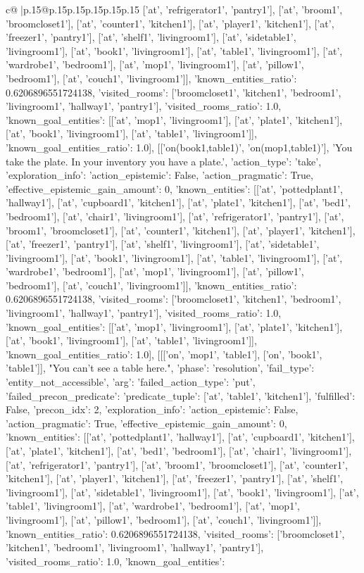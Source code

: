 \documentclass{article}
\begin{document}
{\begin{supertabular}{c@{$\;$}|p{.15\linewidth}@{}p{.15\linewidth}p{.15\linewidth}p{.15\linewidth}p{.15\linewidth}p{.15\linewidth}}
{{{['at', 'refrigerator1', 'pantry1'], ['at', 'broom1', 'broomcloset1'], ['at', 'counter1', 'kitchen1'], ['at', 'player1', 'kitchen1'], ['at', 'freezer1', 'pantry1'], ['at', 'shelf1', 'livingroom1'], ['at', 'sidetable1', 'livingroom1'], ['at', 'book1', 'livingroom1'], ['at', 'table1', 'livingroom1'], ['at', 'wardrobe1', 'bedroom1'], ['at', 'mop1', 'livingroom1'], ['at', 'pillow1', 'bedroom1'], ['at', 'couch1', 'livingroom1']], 'known_entities_ratio': 0.6206896551724138, 'visited_rooms': ['broomcloset1', 'kitchen1', 'bedroom1', 'livingroom1', 'hallway1', 'pantry1'], 'visited_rooms_ratio': 1.0, 'known_goal_entities': [['at', 'mop1', 'livingroom1'], ['at', 'plate1', 'kitchen1'], ['at', 'book1', 'livingroom1'], ['at', 'table1', 'livingroom1']], 'known_goal_entities_ratio': 1.0}}], [['on(book1,table1)', 'on(mop1,table1)'], 'You take the plate. In your inventory you have a plate.', {'action_type': 'take', 'exploration_info': {'action_epistemic': False, 'action_pragmatic': True, 'effective_epistemic_gain_amount': 0, 'known_entities': [['at', 'pottedplant1', 'hallway1'], ['at', 'cupboard1', 'kitchen1'], ['at', 'plate1', 'kitchen1'], ['at', 'bed1', 'bedroom1'], ['at', 'chair1', 'livingroom1'], ['at', 'refrigerator1', 'pantry1'], ['at', 'broom1', 'broomcloset1'], ['at', 'counter1', 'kitchen1'], ['at', 'player1', 'kitchen1'], ['at', 'freezer1', 'pantry1'], ['at', 'shelf1', 'livingroom1'], ['at', 'sidetable1', 'livingroom1'], ['at', 'book1', 'livingroom1'], ['at', 'table1', 'livingroom1'], ['at', 'wardrobe1', 'bedroom1'], ['at', 'mop1', 'livingroom1'], ['at', 'pillow1', 'bedroom1'], ['at', 'couch1', 'livingroom1']], 'known_entities_ratio': 0.6206896551724138, 'visited_rooms': ['broomcloset1', 'kitchen1', 'bedroom1', 'livingroom1', 'hallway1', 'pantry1'], 'visited_rooms_ratio': 1.0, 'known_goal_entities': [['at', 'mop1', 'livingroom1'], ['at', 'plate1', 'kitchen1'], ['at', 'book1', 'livingroom1'], ['at', 'table1', 'livingroom1']], 'known_goal_entities_ratio': 1.0}}], [[['on', 'mop1', 'table1'], ['on', 'book1', 'table1']], "You can't see a table here.", {'phase': 'resolution', 'fail_type': 'entity_not_accessible', 'arg': {'failed_action_type': 'put', 'failed_precon_predicate': {'predicate_tuple': ['at', 'table1', 'kitchen1'], 'fulfilled': False, 'precon_idx': 2}}, 'exploration_info': {'action_epistemic': False, 'action_pragmatic': True, 'effective_epistemic_gain_amount': 0, 'known_entities': [['at', 'pottedplant1', 'hallway1'], ['at', 'cupboard1', 'kitchen1'], ['at', 'plate1', 'kitchen1'], ['at', 'bed1', 'bedroom1'], ['at', 'chair1', 'livingroom1'], ['at', 'refrigerator1', 'pantry1'], ['at', 'broom1', 'broomcloset1'], ['at', 'counter1', 'kitchen1'], ['at', 'player1', 'kitchen1'], ['at', 'freezer1', 'pantry1'], ['at', 'shelf1', 'livingroom1'], ['at', 'sidetable1', 'livingroom1'], ['at', 'book1', 'livingroom1'], ['at', 'table1', 'livingroom1'], ['at', 'wardrobe1', 'bedroom1'], ['at', 'mop1', 'livingroom1'], ['at', 'pillow1', 'bedroom1'], ['at', 'couch1', 'livingroom1']], 'known_entities_ratio': 0.6206896551724138, 'visited_rooms': ['broomcloset1', 'kitchen1', 'bedroom1', 'livingroom1', 'hallway1', 'pantry1'], 'visited_rooms_ratio': 1.0, 'known_goal_entities': }}}
\end{supertabular}}
\end{document}
